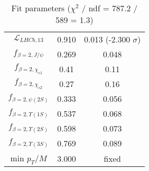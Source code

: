 \begin{table}[h!]
\begin{tabular}{c|c|c}
$\mathcal L_{LHCb,13}$ & 0.910 & 0.013 (-2.300 $\sigma$) \\
$f_{\beta=2,J/\psi}$ & 0.269 & 0.048 \\
$f_{\beta=2,\chi_{c1}}$ & 0.41 & 0.11 \\
$f_{\beta=2,\chi_{c2}}$ & 0.27 & 0.16 \\
$f_{\beta=2,\psi(2S)}$ & 0.333 & 0.056 \\
$f_{\beta=2,\Upsilon(1S)}$ & 0.537 & 0.068 \\
$f_{\beta=2,\Upsilon(2S)}$ & 0.598 & 0.073 \\
$f_{\beta=2,\Upsilon(3S)}$ & 0.769 & 0.089 \\
min $p_T/M$ & 3.000 & fixed \\
\end{tabular}
\caption{Fit parameters ($\chi^2$ / ndf = 787.2 / 589 = 1.3)}
\end{table}

